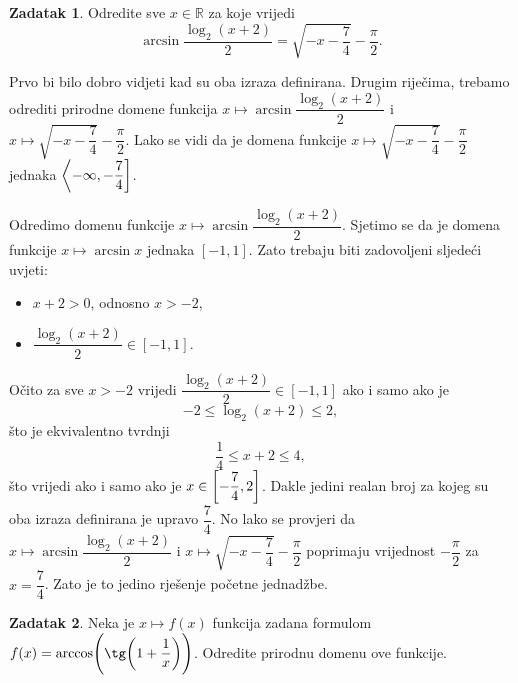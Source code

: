 \documentclass{book}
\let\originalleft\left
\let\originalright\right
\renewcommand{\left}{\mathopen{}\mathclose\bgroup\originalleft}
\renewcommand{\right}{\aftergroup\egroup\originalright}
\renewenvironment{proof}{%
    \vspace{-\parskip}\begin{oldproof}%
    }{%
    \end{oldproof}%
}
\theoremstyle{definition}
\theoremstyle{definition}
\newtheorem{exercise}{Zadatak}
\theoremstyle{remark}
\begin{document}
\begin{exercise}
Odredite sve $x\in \mathbb{R}$ za koje vrijedi
$$\arcsin{\dfrac{\log_2(x+2)}{2}}=\sqrt{-x-\dfrac{7}{4}}-\dfrac{\pi}{2}.$$
\end{exercise}
\begin{proof}[Rješenje]
Prvo bi bilo dobro vidjeti kad su oba izraza definirana. Drugim riječima, trebamo odrediti prirodne domene funkcija $x\mapsto \arcsin{\dfrac{\log_2(x+2)}{2}}$ i $x\mapsto \sqrt{-x-\dfrac{7}{4}}-\dfrac{\pi}{2}$. Lako se vidi da je domena funkcije $x\mapsto \sqrt{-x-\dfrac{7}{4}}-\dfrac{\pi}{2}$ jednaka $\left\langle -\infty, -\dfrac{7}{4}\right]$.

Odredimo domenu funkcije $x\mapsto \arcsin{\dfrac{\log_2(x+2)}{2}}$. Sjetimo se da je domena funkcije $x\mapsto \arcsin{x}$ jednaka $[-1, 1]$. Zato trebaju biti zadovoljeni sljedeći uvjeti:
\begin{itemize}
\item $x+2>0$, odnosno $x>-2$,
\item $\dfrac{\log_2(x+2)}{2}\in [-1, 1]$.
\end{itemize}
Očito za sve $x>-2$ vrijedi $\dfrac{\log_2(x+2)}{2}\in [-1, 1]$ ako i samo ako je
$$-2\leq \log_2(x+2)\leq 2,$$
što je ekvivalentno tvrdnji
$$\dfrac{1}{4}\leq x+2\leq 4,$$
što vrijedi ako i samo ako je $x\in \left[-\dfrac{7}{4}, 2\right]$. Dakle jedini realan broj za kojeg su oba izraza definirana je upravo $\dfrac{7}{4}$. No lako se provjeri da $x\mapsto \arcsin{\dfrac{\log_2(x+2)}{2}}$ i $x\mapsto \sqrt{-x-\dfrac{7}{4}}-\dfrac{\pi}{2}$ poprimaju vrijednost $-\dfrac{\pi}{2}$ za $x=\dfrac{7}{4}$. Zato je to jedino rješenje početne jednadžbe.
\end{proof}
\begin{exercise}
Neka je $x\mapsto f(x)$ funkcija zadana formulom $f(x)=\arccos\left(\tg\left(1+\dfrac{1}{x}\right)\right)$. Odredite prirodnu domenu ove funkcije.
\end{exercise}
\end{document}
